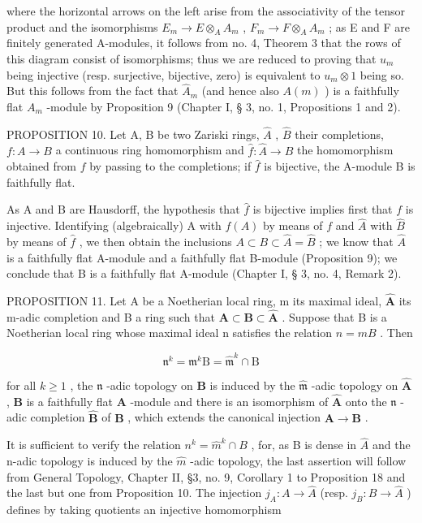 where the horizontal arrows on the left arise from the associativity of the tensor product and the isomorphisms \(E_{m} \rightarrow E \otimes_{A} A_{m}\) , \(F_{m} \rightarrow F \otimes_{A} A_{m}\) ; as E and F are finitely generated A-modules, it follows from no. 4, Theorem 3 that the rows of this diagram consist of isomorphisms; thus we are reduced to proving that \(u_{m}\) being injective (resp. surjective, bijective, zero) is equivalent to \(u_{m} \otimes 1\) being so. But this follows from the fact that \(\hat{A}_{m}\) (and hence also \(A(m)\) ) is a faithfully flat \(A_{m}\) -module by Proposition 9 (Chapter I, § 3, no. 1, Propositions 1 and 2).

PROPOSITION 10. Let A, B be two Zariski rings, \(\hat{A}\) , \(\hat{B}\) their completions, \(f\colon A\to B\) a continuous ring homomorphism and \(\hat{f}\colon\hat{A}\to\hat{B}\) the homomorphism obtained from \(f\) by passing to the completions; if \(\hat{f}\) is bijective, the A-module B is faithfully flat.

As A and B are Hausdorff, the hypothesis that \(\hat{f}\) is bijective implies first that \(f\) is injective. Identifying (algebraically) A with \(f(A)\) by means of \(f\) and \(\hat{A}\) with \(\hat{B}\) by means of \(\hat{f}\) , we then obtain the inclusions \(A \subset B \subset \hat{A} = \hat{B}\) ; we know that \(\hat{A}\) is a faithfully flat A-module and a faithfully flat B-module (Proposition 9); we conclude that B is a faithfully flat A-module (Chapter I, § 3, no. 4, Remark 2).

PROPOSITION 11. Let A be a Noetherian local ring, m its maximal ideal, \(\hat{\mathbf{A}}\) its m-adic completion and B a ring such that \(\mathbf{A} \subset \mathbf{B} \subset \hat{\mathbf{A}}\) . Suppose that B is a Noetherian local ring whose maximal ideal n satisfies the relation \(n = mB\) . Then

\[
\mathfrak {n} ^ {k} = \mathfrak {m} ^ {k} \mathrm{B} = \hat {\mathfrak {m}} ^ {k} \cap \mathrm{B}
\]

for all \(k \geqslant 1\) , the \(\mathfrak{n}\) -adic topology on \(\mathbf{B}\) is induced by the \(\hat{\mathfrak{m}}\) -adic topology on \(\hat{\mathbf{A}}\) , \(\mathbf{B}\) is a faithfully flat \(\mathbf{A}\) -module and there is an isomorphism of \(\hat{\mathbf{A}}\) onto the \(\mathfrak{n}\) -adic completion \(\hat{\mathbf{B}}\) of \(\mathbf{B}\) , which extends the canonical injection \(\mathbf{A} \to \mathbf{B}\) .

It is sufficient to verify the relation \(n^{k} = \hat{m}^{k} \cap B\) , for, as B is dense in \(\hat{A}\) and the n-adic topology is induced by the \(\hat{m}\) -adic topology, the last assertion will follow from General Topology, Chapter II, §3, no. 9, Corollary 1 to Proposition 18 and the last but one from Proposition 10. The injection \(j_{A}: A \to \hat{A}\) (resp. \(j_{B}: B \to \hat{A}\) ) defines by taking quotients an injective homomorphism

